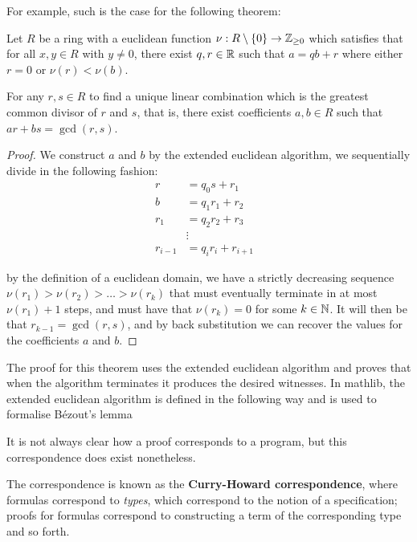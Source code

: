 For example, such is the case for the following theorem:

\begin{example}
    Let $R$ be a ring with a euclidean function $\nu : R \setminus \{0\} \rightarrow \mathbb{Z}_{\geq 0}$ which satisfies that for all $x, y \in R$ with $y \ne 0$, there exist $q, r \in \mathbb{R}$ such that $a  = qb + r$ where either $r = 0$ or $\nu(r) < \nu(b)$.

    For any $r,s \in R$ to find a unique linear combination which is the greatest common divisor of $r$ and $s$, that is, there exist coefficients $a, b \in R$ such that $ar + bs = \gcd(r, s)$.
\end{example}
\begin{proof}
    We construct $a$ and $b$ by the extended euclidean algorithm, we sequentially divide in the following fashion:
      \begin{align}
          r &= q_0 s + r_1\\
          b &= q_1 r_1 + r_2\\
          r_1 &= q_2 r_2 + r_3\\
          &\vdots\\
          r_{i-1} &= q_i r_i + r_{i + 1}&
      \end{align}
  
      by the definition of a euclidean domain, we have a strictly decreasing sequence $\nu(r_1) > \nu(r_2) > \ldots > \nu(r_k)$ that must eventually terminate in at most $\nu(r_1) + 1$ steps,
      and must have that $\nu(r_k) = 0$ for some $k \in \mathbb{N}$. It will then be that $r_{k -1} = \gcd(r, s)$, and by back substitution we can recover the values for the coefficients $a$ and $b$.
  \end{proof}

The proof for this theorem uses the extended euclidean algorithm and proves that when the algorithm terminates it produces the desired witnesses.
In mathlib, the extended euclidean algorithm is defined in the following way and is used to formalise Bézout's lemma


It is not always clear how a proof corresponds to a program, but this correspondence does exist nonetheless.

The correspondence is known as the \textbf{Curry-Howard correspondence}, where formulas correspond to \textit{types}, which correspond to the notion of a specification;
proofs for formulas correspond to constructing a term of the corresponding type and so forth. 

